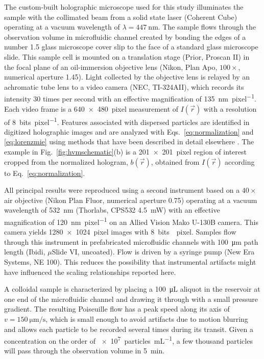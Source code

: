The custom-built holographic microscope used for this study
illuminates the sample with the collimated beam from
a solid state laser (Coherent Cube)
operating at a vacuum wavelength of $\lambda = \SI{447}{\nm}$.
The sample flows through the observation volume in 
microfluidic channel created by bonding
the edges of a number 1.5 glass microscope cover slip to the face of a
standard glass microscope slide.
This sample cell is mounted on a translation stage (Prior, Proscan II)
in the focal plane of an oil-immersion objective lens
(Nikon, Plan Apo, $100\times$, numerical aperture 1.45).
Light collected by the objective lens is relayed by an achromatic
tube lens to a video camera (NEC, TI-324AII), which records its
intensity 30 times per second with an effective magnification
of \SI{135}{\nm\per pixel}.
Each video frame is a \SI{640 x 480}{pixel} measurement of $I(\vec{r})$
with a resolution of \SI{8}{bits\per pixel}.
Features associated with dispersed particles are identified in
digitized holographic images \cite{krishnatreya14a} 
and are analyzed with Eqs.~\eqref{eq:normalization} and \eqref{eq:lorenzmie}
using methods that have been described in detail elsewhere
\cite{yevick14,krishnatreya14}.
The example in Fig.~\ref{fig:hvmschematic}(b) is a 
\SI{201 x 201}{pixel} region of interest cropped from the
normalized hologram, $b(\vec{r})$, obtained from $I(\vec{r})$
according to Eq.~\eqref{eq:normalization}.

All principal results were reproduced using a second instrument based 
on a $40\times$ air objective 
(Nikon Plan Fluor, numerical aperture 0.75)
operating at a vacuum wavelength of \SI{532}{\nm} 
(Thorlabs, CPS532 \SI{4.5}{\milli\watt})
with an effective magnification of \SI{120}{\nm\per pixel}
on an Allied Vision Mako U-130B camera.
This camera yields \SI{1280 x 1024}{pixel} images with
\SI{8}{bits \per pixel}.
Samples flow through this instrument in prefabricated microfluidic
channels with \SI{100}{\um} path length (Ibidi, $\mu$Slide VI,
uncoated).
Flow is driven by a syringe pump (New Era Systems, NE 100).
This reduces the possibility that instrumental artifacts
might have influenced the scaling relationships reported here.

A colloidal sample is characterized by placing a \SI{100}{\micro\liter}
aliquot in the reservoir at one end of the microfluidic channel and
drawing it through with a small pressure gradient.
The resulting Poiseuille flow has a peak speed along its axis 
of $v = \SI{150}{\um\per\second}$, which is small enough
to avoid artifacts due to motion blurring \cite{cheong09,dixon11}
and allows each particle to be recorded several times
during its transit.
Given a concentration on the order of
\SI{e7}{particles\per\milli\liter},
a few thousand particles will pass through the observation volume
in \SI{5}{\minute}.

